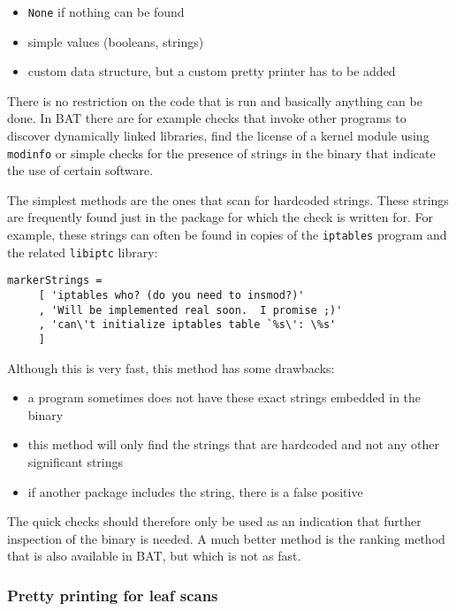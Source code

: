 \documentclass[10pt]{article}
\begin{document}
\begin{itemize}
\item \texttt{None} if nothing can be found
\item simple values (booleans, strings)
\item custom data structure, but a custom pretty printer has to be added
\end{itemize}

There is no restriction on the code that is run and basically anything can be
done. In BAT there are for example checks that invoke other programs to discover
dynamically linked libraries, find the license of a kernel module using
\texttt{modinfo} or simple checks for the presence of strings in the binary
that indicate the use of certain software.

The simplest methods are the ones that scan for hardcoded strings. These strings
are frequently found just in the package for which the check is written for. For
example, these strings can often be found in copies of the \texttt{iptables}
program and the related \texttt{libiptc} library:

\begin{verbatim}
markerStrings =
     [ 'iptables who? (do you need to insmod?)'
     , 'Will be implemented real soon.  I promise ;)'
     , 'can\'t initialize iptables table `%s\': \%s'
     ]
\end{verbatim}

Although this is very fast, this method has some drawbacks:

\begin{itemize}
\item a program sometimes does not have these exact strings embedded in the
binary
\item this method will only find the strings that are hardcoded and not any
other significant strings
\item if another package includes the string, there is a false positive
\end{itemize}

The quick checks should therefore only be used as an indication that further
inspection of the binary is needed. A much better method is the ranking method
that is also available in BAT, but which is not as fast.

\subsubsection{Pretty printing for leaf scans}
\end{document}
